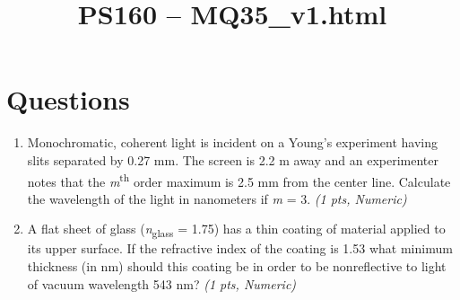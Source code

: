 \documentclass[11pt]{article}
\title{PS160 -- MQ35\_v1.html}
\date{}
\begin{document}
\maketitle

\section*{Questions}

\begin{enumerate}[leftmargin=*]
  \item Monochromatic, coherent light is incident on a Young's experiment having slits separated by 0.27 mm. The screen is 2.2 m away and an experimenter notes that the \emph{m}\textsuperscript{th} order maximum is 2.5 mm from the center line. Calculate the wavelength of the light in nanometers if \emph{m} = 3. \hfill \textit{(1 pts, Numeric)}

  \item A flat sheet of glass (\emph{n}\textsubscript{glass} = 1.75) has a thin coating of material applied to its upper surface. If the refractive index of the coating is 1.53 what minimum thickness (in nm) should this coating be in order to be nonreflective to light of vacuum wavelength 543 nm? \hfill \textit{(1 pts, Numeric)}

\end{enumerate}
\end{document}
